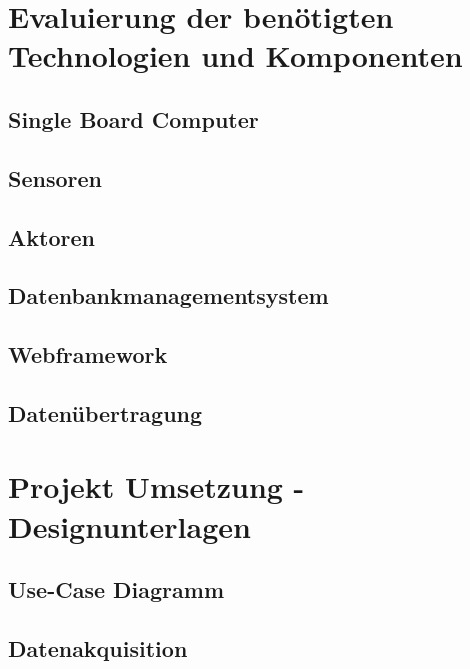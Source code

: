 \documentclass[12pt]{article}
\begin{document}
\newpage %
\section{Evaluierung der benötigten Technologien und Komponenten}
%

\subsection{Single Board Computer}
%

\subsection{Sensoren}
%

\subsection{Aktoren}
%

\subsection{Datenbankmanagementsystem}
%

\subsection{Webframework}
%

\subsection{Daten\"ubertragung}
%

\newpage %
\section{Projekt Umsetzung - Designunterlagen}
%

\subsection{Use-Case Diagramm}
%

\subsection{Datenakquisition}
%
\end{document}
